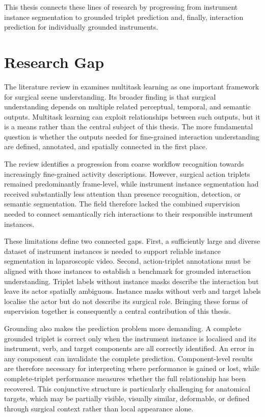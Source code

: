 This thesis connects these lines of research by progressing from instrument instance segmentation to grounded triplet prediction and, finally, interaction prediction for individually grounded instruments.

\section{Research Gap}
\label{sec:introduction-gap}

The literature review in  examines multitask learning as one important framework for surgical scene understanding. Its broader finding is that surgical understanding depends on multiple related perceptual, temporal, and semantic outputs. Multitask learning can exploit relationships between such outputs, but it is a means rather than the central subject of this thesis. The more fundamental question is whether the outputs needed for fine-grained interaction understanding are defined, annotated, and spatially connected in the first place.

The review identifies a progression from coarse workflow recognition towards increasingly fine-grained activity descriptions. However, surgical action triplets remained predominantly frame-level, while instrument instance segmentation had received substantially less attention than presence recognition, detection, or semantic segmentation. The field therefore lacked the combined supervision needed to connect semantically rich interactions to their responsible instrument instances.

These limitations define two connected gaps. First, a sufficiently large and diverse dataset of instrument instances is needed to support reliable instance segmentation in laparoscopic video. Second, action-triplet annotations must be aligned with those instances to establish a benchmark for grounded interaction understanding. Triplet labels without instance masks describe the interaction but leave its actor spatially ambiguous. Instance masks without verb and target labels localise the actor but do not describe its surgical role. Bringing these forms of supervision together is consequently a central contribution of this thesis.

Grounding also makes the prediction problem more demanding. A complete grounded triplet is correct only when the instrument instance is localised and its instrument, verb, and target components are all correctly identified. An error in any component can invalidate the complete prediction. Component-level results are therefore necessary for interpreting where performance is gained or lost, while complete-triplet performance measures whether the full relationship has been recovered. This conjunctive structure is particularly challenging for anatomical targets, which may be partially visible, visually similar, deformable, or defined through surgical context rather than local appearance alone.

